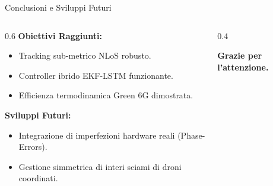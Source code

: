 \documentclass[aspectratio=169,11pt]{beamer}
\begin{document}
\begin{frame}{Conclusioni e Sviluppi Futuri}
    \begin{columns}
        \begin{column}{0.6\textwidth}
            \textbf{Obiettivi Raggiunti:}
            \begin{itemize}
                \item Tracking sub-metrico NLoS robusto.
                \item Controller ibrido EKF-LSTM funzionante.
                \item Efficienza termodinamica Green 6G dimostrata.
            \end{itemize}
            \vspace{1em}
            \textbf{Sviluppi Futuri:}
            \begin{itemize}
                \item Integrazione di imperfezioni hardware reali (Phase-Errors).
                \item Gestione simmetrica di interi sciami di droni coordinati.
            \end{itemize}
        \end{column}
        \begin{column}{0.4\textwidth}
            \begin{center}
                \Large \textbf{Grazie per l'attenzione.}
            \end{center}
        \end{column}
    \end{columns}
\end{frame}
\end{document}

